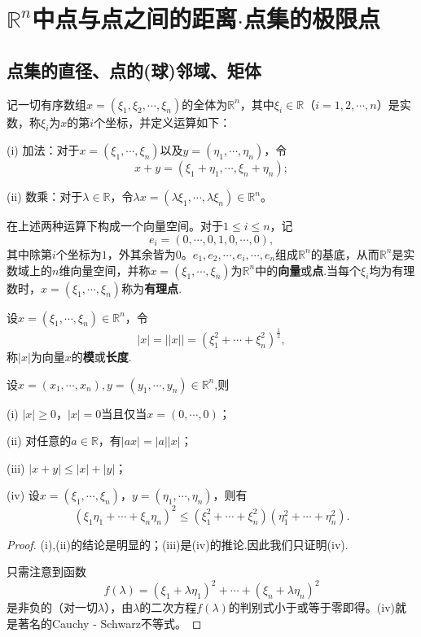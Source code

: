 \documentclass[../../main.tex]{subfiles}%
\begin{document}
\section{$\mathbb{R}^n$中点与点之间的距离$\cdot$点集的极限点}

\subsection{点集的直径、点的(球)邻域、矩体}

\begin{definition}\label{definition:Rn与Rn中的运算}
  记一切有序数组\(x = (\xi_1,\xi_2,\cdots,\xi_n)\)的全体为\(\mathbb{R}^n\)，其中\(\xi_i\in\mathbb{R}\)（\(i = 1,2,\cdots,n\)）是实数，称\(\xi_i\)为\(x\)的第\(i\)个坐标，并定义运算如下：

(i) 加法：对于\(x = (\xi_1,\cdots,\xi_n)\)以及\(y = (\eta_1,\cdots,\eta_n)\)，令
\[x + y = (\xi_1+\eta_1,\cdots,\xi_n+\eta_n);\]

(ii) 数乘：对于\(\lambda\in\mathbb{R}\)，令\(\lambda x = (\lambda\xi_1,\cdots,\lambda\xi_n)\in\mathbb{R}^n\)。

在上述两种运算下构成一个向量空间。对于\(1\leqslant i\leqslant n\)，记
\[e_i = (0,\cdots,0,1,0,\cdots,0),\]
其中除第\(i\)个坐标为\(1\)，外其余皆为\(0\)。\(e_1,e_2,\cdots,e_i,\cdots,e_n\)组成\(\mathbb{R}^n\)的基底，从而\(\mathbb{R}^n\)是实数域上的\(n\)维向量空间，并称\(x = (\xi_1,\cdots,\xi_n)\)为\(\mathbb{R}^n\)中的\textbf{向量}或\textbf{点}.当每个\(\xi_i\)均为有理数时，\(x = (\xi_1,\cdots,\xi_n)\)称为\textbf{有理点}.
\end{definition}

\begin{definition}
设\(x = (\xi_1,\cdots,\xi_n)\in\mathbb{R}^n\)，令
\[|x|=||x|| = (\xi_1^2+\cdots+\xi_n^2)^{\frac{1}{2}},\]
称\(|x|\)为向量\(x\)的\textbf{模}或\textbf{长度}.
\end{definition}

\begin{proposition}[向量的模的性质]\label{proposition:向量的模的性质}
设\(x=(x_1,\cdots ,x_n),y=\left( y_1,\cdots ,y_n \right) \in \mathbb{R} ^n\),则

(i) \(|x|\geqslant0\)，\(|x| = 0\)当且仅当\(x=(0,\cdots,0)\)；

(ii) 对任意的\(a\in\mathbb{R}\)，有\(|ax| = |a||x|\)；

(iii) \(|x + y|\leqslant|x|+|y|\)；

(iv) 设\(x = (\xi_1,\cdots,\xi_n)\)，\(y = (\eta_1,\cdots,\eta_n)\)，则有
\[(\xi_1\eta_1+\cdots+\xi_n\eta_n)^2\leqslant(\xi_1^2+\cdots+\xi_n^2)(\eta_1^2+\cdots+\eta_n^2).\]
\end{proposition}
\begin{proof}

  (i),(ii)的结论是明显的；(iii)是(iv)的推论.因此我们只证明(iv).

只需注意到函数
\[f(\lambda)=(\xi_1+\lambda\eta_1)^2+\cdots+(\xi_n+\lambda\eta_n)^2\]
是非负的（对一切\(\lambda\)），由\(\lambda\)的二次方程\(f(\lambda)\)的判别式小于或等于零即得。(iv)就是著名的Cauchy - Schwarz不等式。

\end{proof}
\end{document}

